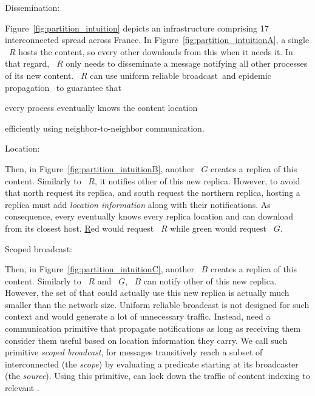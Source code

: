 \begin{asparadesc}
\item [Dissemination:]

Figure~\ref{fig:partition_intuition} depicts an infrastructure
comprising 17 interconnected \processes spread across France. In
Figure~\ref{fig:partition_intuitionA}, a single \Process~$R$ hosts the
content, so every other \process downloads from this \process when it
needs it. In that regard, \Process~$R$ only needs to disseminate a
message notifying all other processes of its new content. \Process~$R$
can use uniform reliable broadcast~\REF and epidemic propagation~\REF
to guarantee that
\begin{inparaenum}[(i)]
\item every process eventually knows the content location
\item efficiently using neighbor-to-neighbor communication.
\end{inparaenum}

\item [Location:]

Then, in Figure~\ref{fig:partition_intuitionB}, another \Process~$G$
creates a replica of this content. Similarly to \Process~$R$, it
notifies other \processes of this new replica. However, to avoid that
north \processes request its replica, and south \processes request the
northern replica, \processes hosting a replica must add \emph{location
information} along with their notifications. As consequence, every
\process eventually knows every replica location and can download from
its closest host. \underline{R}ed \processes would request
\Process~$R$ while \underline{g}reen \processes would request
\Process~$G$.

\item [Scoped broadcast:]

Then, in Figure~\ref{fig:partition_intuitionC}, another \Process~$B$
creates a replica of this content. Similarly to \Process~$R$ and
\Process~$G$, \Process~$B$ can notify other \processes of this new
replica. However, the set of \processes that could actually use this
new replica is actually much smaller than the network size. Uniform
reliable broadcast is not designed for such context and would generate
a lot of unnecessary traffic. Instead, \processes need a communication
primitive that propagate notifications as long as \processes receiving
them consider them useful based on location information they carry. We
call such primitive \emph{scoped broadcast}, for messages transitively
reach a subset of interconnected \processes (the \emph{scope}) by
evaluating a predicate starting at its broadcaster (the
\emph{source}). Using this primitive, \processes can lock down the
traffic of content indexing to relevant \processes.


\end{asparadesc}
